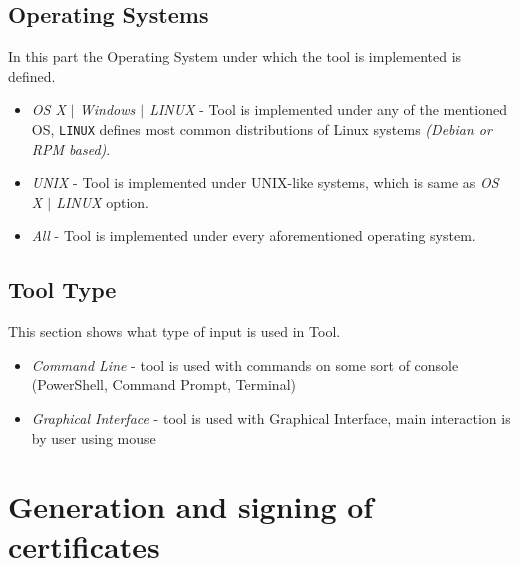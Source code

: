 \documentclass[10pt, a4paper]{report}
\begin{document}
\subsection{Operating Systems}
In this part the Operating System under which the tool is implemented is defined. 
    \begin{itemize}
     \item \textit{OS X $\vert$ Windows $\vert$ LINUX} - Tool is implemented under any of the mentioned OS, \verb+LINUX+ defines most common distributions of Linux systems \textit{(Debian or RPM based)}.
     \item \textit{UNIX} - Tool is implemented under UNIX-like systems, which is same as \textit{OS X $\vert$ LINUX} option.
     \item \textit{All} - Tool is implemented under every aforementioned operating system.
    \end{itemize}

\subsection{Tool Type}
This section shows what type of input is used in Tool. 
\begin{itemize}
\item \textit{Command Line} - tool is used with commands on some sort of console (PowerShell, Command Prompt, Terminal)
\item \textit{Graphical Interface} - tool is used with Graphical Interface, main interaction is by user using mouse
\end{itemize}
\newpage

\section{Generation and signing of certificates}
\end{document}
